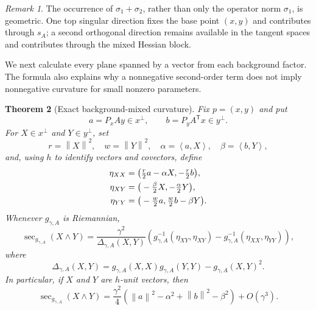 \documentclass[11pt]{amsart}
\newtheorem{theorem}{Theorem}[section]
\theoremstyle{definition}
\theoremstyle{remark}
\newtheorem{remark}[theorem]{Remark}
\DeclareMathOperator{\secop}{sec}
\newcommand{\ip}[2]{\left\langle #1,#2\right\rangle}
\newcommand{\norm}[1]{\left\lVert #1\right\rVert}
\begin{document}
\begin{remark}
The occurrence of $\sigma_1+\sigma_2$, rather than only the operator
norm $\sigma_1$, is geometric.  One top singular direction fixes the
base point $(x,y)$ and contributes through $s_A$; a second orthogonal
direction remains available in the tangent spaces and contributes
through the mixed Hessian block.
\end{remark}

We next calculate every plane spanned by a vector from each background
factor.  The formula also explains why a nonnegative second-order term
does not imply nonnegative curvature for small nonzero parameters.

\begin{theorem}[Exact background-mixed curvature]
\label{thm:mixed-curvature}
Fix $p=(x,y)$ and put
\[
 a=P_xAy\in x^\perp,\qquad b=P_yA^{\mathsf T}x\in y^\perp.
\]
For $X\in x^\perp$ and $Y\in y^\perp$, set
\[
 r=\norm{X}^2,\quad w=\norm{Y}^2,\quad
 \alpha=\ip{a}{X},\quad \beta=\ip{b}{Y},
\]
and, using $h$ to identify vectors and covectors, define
\begin{align}
 \eta_{XX}&=\big(\tfrac r2a-\alpha X,-\tfrac r2b\big),\notag\\
 \eta_{XY}&=\big(-\tfrac\beta2X,-\tfrac\alpha2Y\big),
                                                        \label{eq:etas}\\
 \eta_{YY}&=\big(-\tfrac w2a,\tfrac w2b-\beta Y\big).\notag
\end{align}
Whenever $g_{\gamma,A}$ is Riemannian,
\begin{equation}\label{eq:exact-mixed-curvature}
 \secop_{g_{\gamma,A}}(X\wedge Y)
 =\frac{\gamma^2}{\Delta_{\gamma,A}(X,Y)}
 \left(
  g_{\gamma,A}^{-1}(\eta_{XY},\eta_{XY})
  -g_{\gamma,A}^{-1}(\eta_{XX},\eta_{YY})
 \right),
\end{equation}
where
\[
 \Delta_{\gamma,A}(X,Y)
 =g_{\gamma,A}(X,X)g_{\gamma,A}(Y,Y)
  -g_{\gamma,A}(X,Y)^2.
\]
In particular, if $X$ and $Y$ are $h$-unit vectors, then
\begin{equation}\label{eq:mixed-expansion}
 \secop_{g_{\gamma,A}}(X\wedge Y)
 =\frac{\gamma^2}{4}
 \left(\norm{a}^2-\alpha^2+\norm{b}^2-\beta^2\right)
 +O(\gamma^3).
\end{equation}
\end{theorem}
\end{document}
